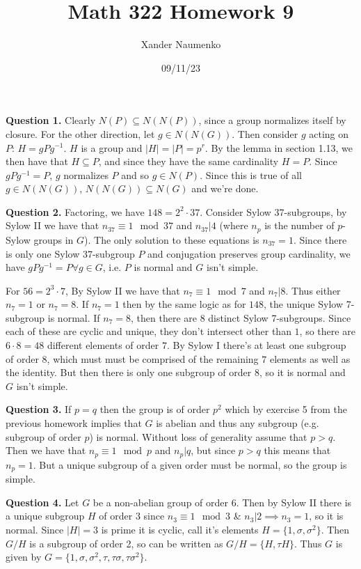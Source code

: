 \documentclass[letterpaper, reqno,11pt]{article}
\begin{document}
\title{Math 322 Homework 9}
\date{09/11/23}
\author{Xander Naumenko}
\maketitle

{\medskip\noindent\bf Question 1.} Clearly $N(P)\subseteq N(N(P))$, since a group normalizes itself by closure. For the other direction, let $g\in N(N(G))$. Then consider $g$ acting on $P$: $H=gPg^{-1}$. $H$ is a group and $|H|=|P|=p^{r}$. By the lemma in section 1.13, we then have that $H\subseteq P$, and since they have the same cardinality $H=P$. Since $gPg^{-1}=P$, $g$ normalizes $P$ and so $g\in N(P)$. Since this is true of all $g\in N(N(G))$, $N(N(G))\subseteq N(G)$ and we're done.

{\medskip\noindent\bf Question 2.} Factoring, we have $148=2^2\cdot 37$. Consider Sylow 37-subgroups, by Sylow II we have that $n_{37}\equiv 1\mod 37$ and $n_{37}|4$ (where $n_p$ is the number of $p$-Sylow groups in $G$). The only solution to these equations is $n_{37}=1$. Since there is only one Sylow 37-subgroup $P$ and conjugation preserves group cardinality, we have $gPg^{-1}=P\forall g\in G$, i.e. $P$ is normal and $G$ isn't simple.

For $56=2^{3}\cdot 7$, By Sylow II we have that $n_{7}\equiv 1\mod 7$ and $n_{7}|8$. Thus either $n_7=1$ or $n_7 =8$. If $n_7=1$ then by the same logic as for $148$, the unique Sylow 7-subgroup is normal. If $n_7=8$, then there are 8 distinct Sylow 7-subgroups. Since each of these are cyclic and unique, they don't intersect other than $1$, so there are $6\cdot 8=48$ different elements of order $7$. By Sylow I there's at least one subgroup of order $8$, which must must be comprised of the remaining $7$ elements as well as the identity. But then there is only one subgroup of order $8$, so it is normal and $G$ isn't simple.

{\medskip\noindent\bf Question 3.} If $p=q$ then the group is of order $p^2$ which by exercise 5 from the previous homework implies that $G$ is abelian and thus any subgroup (e.g. subgroup of order $p$) is normal. Without loss of generality assume that $p>q$. Then we have that $n_p\equiv 1\mod p$ and $n_p|q$, but since $p>q$ this means that $n_p=1$. But a unique subgroup of a given order must be normal, so the group is simple.

{\medskip\noindent\bf Question 4.} Let $G$ be a non-abelian group of order 6. Then by Sylow II there is a unique subgroup $H$ of order  $3$ since $n_{3}\equiv 1\mod 3$ \& $n_3|2\implies n_3=1$, so it is normal. Since $|H|=3$ is prime it is cyclic, call it's elements $H=\{1,\sigma,\sigma^2\}$. Then $G/H$ is a subgroup of order 2, so can be written as $G /H=\{H,\tau H\}$. Thus $G$ is given by $G=\{1,\sigma,\sigma^2,\tau,\tau\sigma,\tau\sigma^2\}$. 
\end{document}
